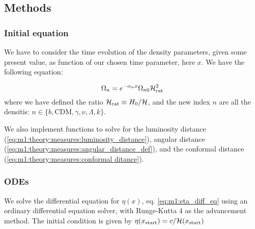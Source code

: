 \subsection{Methods}\label{sec:m1:methods}

\subsubsection{Initial equation}
    We have to consider the time evolution of the density parameters, given some present value, as function of our chosen time parameter, here $x$. We have the following equation:

    \begin{equation}\label{eq:m1:methods:initial:density_evolution}
        \Omega_n = e^{-\alpha_nx}\Omega_{n0}\mathcal{H}_\mathrm{rat}^2
    \end{equation}
    where we have defined the ratio $\mathcal{H}_\mathrm{rat} \equiv H_0/\mathcal{H}$, and the new index $n$ are all the densitis: $n\in\{b, \mathrm{CDM}, \gamma, \nu, \Lambda, k\}$.

    We also implement functions to solve for the luminosity distance (\cref{eq:m1:theory:measures:luminosity_distance}), angular distance (\cref{eq:m1:theory:measures:angular_distance_def}), and the conformal distance (\cref{eq:m1:theory:measures:conformal ditance}).



\subsubsection{ODEs}

We solve the differential equation for $\eta(x)$, eq. \ref{eq:m1:eta_diff_eq} using an ordinary differential equation solver, with Runge-Kutta 4 as the advancement method. The initial condition is given by $\eta(x_\mathrm{start})=c/\mathcal{H}(x_\mathrm{start})$
